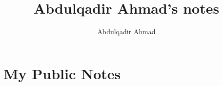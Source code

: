 \documentclass{article}
\title{Abdulqadir Ahmad's notes}
\author{Abdulqadir Ahmad}
\begin{document}
\maketitle
\tableofcontents
\section{My Public Notes}

\end{document}
